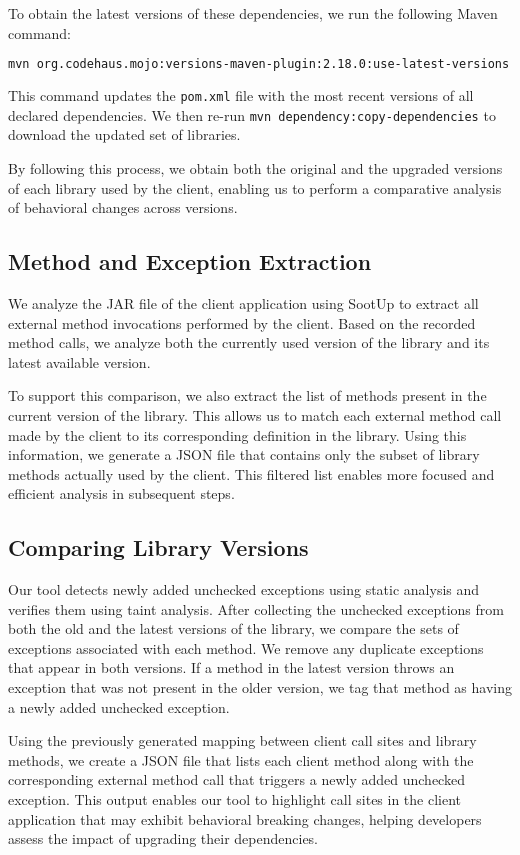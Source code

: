 To obtain the latest versions of these dependencies, we run the following Maven command:
\begin{lstlisting}[language=bash, breaklines=true, basicstyle=\ttfamily\small]
mvn org.codehaus.mojo:versions-maven-plugin:2.18.0:use-latest-versions
\end{lstlisting}
This command updates the \texttt{pom.xml} file with the most recent versions of all declared dependencies. We then re-run \texttt{mvn dependency:copy-dependencies} to download the updated set of libraries.

By following this process, we obtain both the original and the upgraded versions of each library used by the client, enabling us to perform a comparative analysis of behavioral changes across versions.

\subsection{Method and Exception Extraction}

We analyze the JAR file of the client application using SootUp to extract all external method invocations performed by the client. Based on the recorded method calls, we analyze both the currently used version of the library and its latest available version.

To support this comparison, we also extract the list of methods present in the current version of the library. This allows us to match each external method call made by the client to its corresponding definition in the library. Using this information, we generate a JSON file that contains only the subset of library methods actually used by the client. This filtered list enables more focused and efficient analysis in subsequent steps.

\subsection{Comparing Library Versions}

Our tool detects newly added unchecked exceptions using static analysis and verifies them using taint analysis. After collecting the unchecked exceptions from both the old and the latest versions of the library, we compare the sets of exceptions associated with each method. We remove any duplicate exceptions that appear in both versions. If a method in the latest version throws an exception that was not present in the older version, we tag that method as having a newly added unchecked exception.

Using the previously generated mapping between client call sites and library methods, we create a JSON file that lists each client method along with the corresponding external method call that triggers a newly added unchecked exception. This output enables our tool to highlight call sites in the client application that may exhibit behavioral breaking changes, helping developers assess the impact of upgrading their dependencies.
